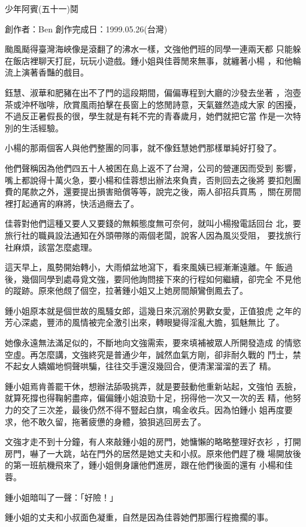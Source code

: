 



少年阿賓(五十一)鬩

創作者：Ben
創作完成日：1999.05.26(台灣)


颱風颳得臺灣海峽像是滾翻了的沸水一樣，文強他們班的同學一連兩天都
只能躲在飯店裡聊天打屁，玩玩小遊戲。鍾小姐與佳蓉閒來無事，就纏著小楊
，和他輪流上演著香豔的戲目。

鈺慧、淑華和肥豬在出不了門的這段期間，偏偏專程到大廳的沙發去坐著
，泡壺茶或沖杯咖啡，欣賞風雨拍擊在長窗上的悠閒詩意，天氣雖然造成大家
的困擾，不過反正暑假長的很，學生就是有耗不完的青春歲月，她們就把它當
作是一次特別的生活經驗。

小楊的那兩個客人與他們整團的同事，就不像鈺慧她們那樣單純好打發了。

他們聲稱因為他們四五十人被困在島上返不了台灣，公司的營運因而受到
影響，嘴上都說得十萬火急，要小楊和佳蓉想出辦法來負責，否則回去之後將
要扣剋團費的尾款之外，還要提出損害賠償等等，說完之後，兩人卻招兵買馬
，關在房間裡打起通宵的麻將，快活過癮去了。

佳蓉對他們這種又要人又要錢的無賴態度無可奈何，就叫小楊撥電話回台
北，要旅行社的職員設法通知在外頭帶隊的兩個老闆，說客人因為風災受阻，
要找旅行社麻煩，該當怎麼處理。

這天早上，風勢開始轉小，大雨傾盆地瀉下，看來風姨已經漸漸遠離。午
飯過後，幾個同學到處尋覓文強，要同他詢問接下來的行程如何繼續，卻完全
不見他的蹤跡。原來他覤了個空，拉著鍾小姐又上她房間顛鸞倒鳳去了。

鍾小姐原本就是個世故的風騷女郎，這幾日來沉溺於男歡女愛，正值狼虎
之年的芳心深處，豐沛的風情被完全激引出來，轉眼變得淫亂大膽，狐魅無比
了。

她像永遠無法滿足似的，不斷地向文強需索，要來填補被眾人所開發造成
的情慾空虛。再怎麼講，文強終究是普通少年，誠然血氣方剛，卻非耐久戰的
鬥士，禁不起女人嬌媚地恫聲哄騙，往往交手還沒幾回合，便清潔溜溜的丟了
精。

鍾小姐焉肯善罷干休，想辦法舔吸挑弄，就是要鼓動他重新站起，文強怕
丟臉，就算死撐也得鞠躬盡瘁，偏偏鍾小姐浪勁十足，拐得他一次又一次的丟
精，他努力的交了三次差，最後仍然不得不豎起白旗，鳴金收兵。因為怕鍾小
姐再度要求，他不敢久留，拖著疲憊的身體，狼狽逃回房去了。

文強才走不到十分鐘，有人來敲鍾小姐的房門，她慵懶的略略整理好衣衫
，打開房門，嚇了一大跳，站在門外的居然是她丈夫和小叔。原來他們趕了機
場開放後的第一班航機飛來了，鍾小姐側身讓他們進房，跟在他們後面的還有
小楊和佳蓉。

鍾小姐暗叫了一聲：「好險！」

鍾小姐的丈夫和小叔面色凝重，自然是因為佳蓉她們那團行程擔擱的事。

